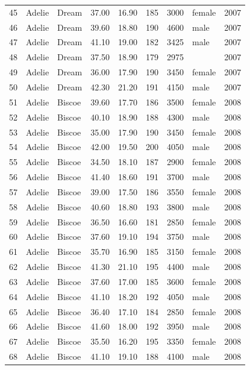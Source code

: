 \documentclass{article}\usepackage[]{graphicx}\usepackage[]{xcolor}
\begin{document}
\begin{table}[ht]
\begin{tabular}{rllrrrrlr}
  45 & Adelie & Dream & 37.00 & 16.90 & 185 & 3000 & female & 2007 \\ 
  46 & Adelie & Dream & 39.60 & 18.80 & 190 & 4600 & male & 2007 \\ 
  47 & Adelie & Dream & 41.10 & 19.00 & 182 & 3425 & male & 2007 \\ 
  48 & Adelie & Dream & 37.50 & 18.90 & 179 & 2975 &  & 2007 \\ 
  49 & Adelie & Dream & 36.00 & 17.90 & 190 & 3450 & female & 2007 \\ 
  50 & Adelie & Dream & 42.30 & 21.20 & 191 & 4150 & male & 2007 \\ 
  51 & Adelie & Biscoe & 39.60 & 17.70 & 186 & 3500 & female & 2008 \\ 
  52 & Adelie & Biscoe & 40.10 & 18.90 & 188 & 4300 & male & 2008 \\ 
  53 & Adelie & Biscoe & 35.00 & 17.90 & 190 & 3450 & female & 2008 \\ 
  54 & Adelie & Biscoe & 42.00 & 19.50 & 200 & 4050 & male & 2008 \\ 
  55 & Adelie & Biscoe & 34.50 & 18.10 & 187 & 2900 & female & 2008 \\ 
  56 & Adelie & Biscoe & 41.40 & 18.60 & 191 & 3700 & male & 2008 \\ 
  57 & Adelie & Biscoe & 39.00 & 17.50 & 186 & 3550 & female & 2008 \\ 
  58 & Adelie & Biscoe & 40.60 & 18.80 & 193 & 3800 & male & 2008 \\ 
  59 & Adelie & Biscoe & 36.50 & 16.60 & 181 & 2850 & female & 2008 \\ 
  60 & Adelie & Biscoe & 37.60 & 19.10 & 194 & 3750 & male & 2008 \\ 
  61 & Adelie & Biscoe & 35.70 & 16.90 & 185 & 3150 & female & 2008 \\ 
  62 & Adelie & Biscoe & 41.30 & 21.10 & 195 & 4400 & male & 2008 \\ 
  63 & Adelie & Biscoe & 37.60 & 17.00 & 185 & 3600 & female & 2008 \\ 
  64 & Adelie & Biscoe & 41.10 & 18.20 & 192 & 4050 & male & 2008 \\ 
  65 & Adelie & Biscoe & 36.40 & 17.10 & 184 & 2850 & female & 2008 \\ 
  66 & Adelie & Biscoe & 41.60 & 18.00 & 192 & 3950 & male & 2008 \\ 
  67 & Adelie & Biscoe & 35.50 & 16.20 & 195 & 3350 & female & 2008 \\ 
  68 & Adelie & Biscoe & 41.10 & 19.10 & 188 & 4100 & male & 2008 \\ 

\end{tabular}
\end{table}
\end{document}
